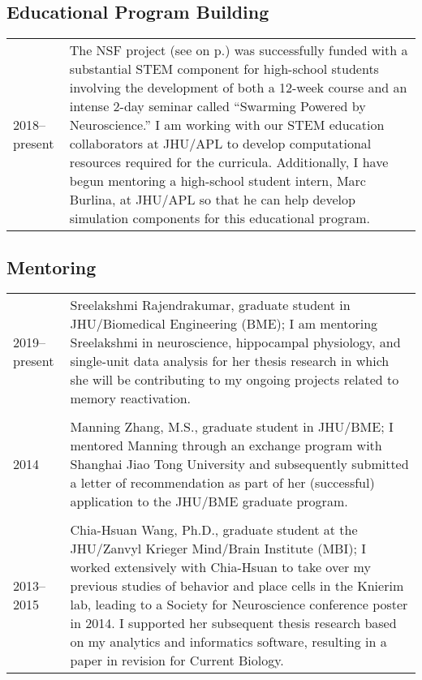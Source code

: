 \documentclass[10pt]{article}
\begin{document}
\smallskip
\subsection*{Educational Program Building}

\begin{tabular}{@{\hspace{0.2in}}l>{\raggedright\arraybackslash}p{}}
  2018--present \hspace{0.1in} & The NSF project (see
  \emph{\nameref{sec:cursupport}} on p.\pageref{sec:cursupport}) was
  successfully funded with a substantial STEM component for high-school students
  involving the development of both a 12-week course and an intense 2-day
  seminar called ``Swarming Powered by Neuroscience.'' I am working with our
  STEM education collaborators at JHU/APL to develop computational resources
  required for the curricula. Additionally, I have begun mentoring a high-school
  student intern, Marc Burlina, at JHU/APL so that he can help develop
  simulation components for this educational program.
\end{tabular}

\subsection*{Mentoring}

\begin{tabular}{@{\hspace{0.2in}}l>{\raggedright\arraybackslash}p{}}
  2019--present \hspace{0.1in} & Sreelakshmi Rajendrakumar, graduate student in
  JHU/Biomedical Engineering (BME); I am mentoring Sreelakshmi in neuroscience,
  hippocampal physiology, and single-unit data analysis for her thesis research
  in which she will be contributing to my ongoing projects related to memory
  reactivation.\\
  \tabularnewline
  2014 & Manning Zhang, M.S., graduate student in JHU/BME; I mentored Manning
  through an exchange program with Shanghai Jiao Tong University and
  subsequently submitted a letter of recommendation as part of her (successful)
  application to the JHU/BME graduate program.\\
  \tabularnewline
  2013--2015 & Chia-Hsuan Wang, Ph.D., graduate student at the JHU/Zanvyl
  Krieger Mind/Brain Institute (MBI); I worked extensively with Chia-Hsuan to
  take over my previous studies of behavior and place cells in the Knierim lab,
  leading to a Society for Neuroscience conference poster in 2014. I supported
  her subsequent thesis research based on my analytics and informatics software,
  resulting in a paper in revision for Current Biology.\\
\end{tabular}
\end{document}
